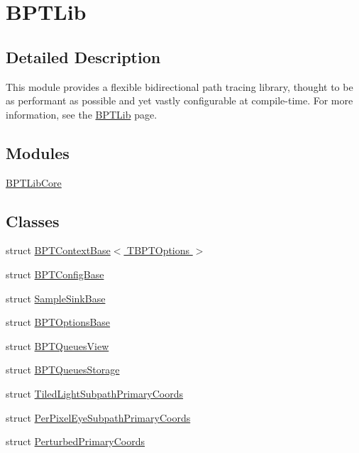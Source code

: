 \hypertarget{group___b_p_t_lib}{}\section{B\+P\+T\+Lib}
\label{group___b_p_t_lib}


\subsection{Detailed Description}
This module provides a flexible bidirectional path tracing library, thought to be as performant as possible and yet vastly configurable at compile-\/time. For more information, see the \hyperlink{_b_p_t_lib_page}{B\+P\+T\+Lib} page. \subsection*{Modules}
\begin{DoxyCompactItemize}
\item 
\hyperlink{group___b_p_t_lib_core}{B\+P\+T\+Lib\+Core}
\end{DoxyCompactItemize}
\subsection*{Classes}
\begin{DoxyCompactItemize}
\item 
struct \hyperlink{struct_b_p_t_context_base}{B\+P\+T\+Context\+Base$<$ T\+B\+P\+T\+Options $>$}
\item 
struct \hyperlink{struct_b_p_t_config_base}{B\+P\+T\+Config\+Base}
\item 
struct \hyperlink{struct_sample_sink_base}{Sample\+Sink\+Base}
\item 
struct \hyperlink{struct_b_p_t_options_base}{B\+P\+T\+Options\+Base}
\item 
struct \hyperlink{struct_b_p_t_queues_view}{B\+P\+T\+Queues\+View}
\item 
struct \hyperlink{struct_b_p_t_queues_storage}{B\+P\+T\+Queues\+Storage}
\item 
struct \hyperlink{struct_tiled_light_subpath_primary_coords}{Tiled\+Light\+Subpath\+Primary\+Coords}
\item 
struct \hyperlink{struct_per_pixel_eye_subpath_primary_coords}{Per\+Pixel\+Eye\+Subpath\+Primary\+Coords}
\item 
struct \hyperlink{struct_perturbed_primary_coords}{Perturbed\+Primary\+Coords}
\end{DoxyCompactItemize}
